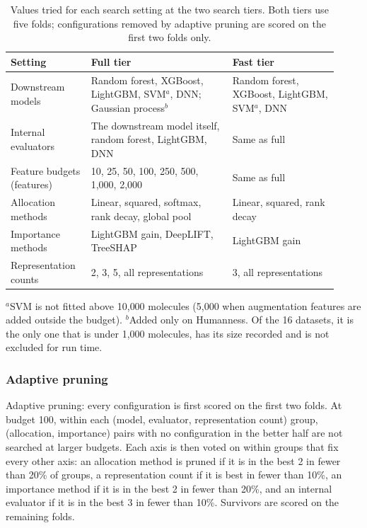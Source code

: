 \begin{table}[htbp]
\centering
\caption[Values tried for each search setting.]{Values tried for each search setting at the two search tiers. Both tiers use five folds; configurations removed by adaptive pruning are scored on the first two folds only.}
\label{tab:search_tiers}
\begin{adjustbox}{max width=\textwidth}
\begin{tabular}{@{}P{0.22\linewidth}P{0.40\linewidth}P{0.30\linewidth}@{}}
\toprule
Setting & Full tier & Fast tier \\
\midrule
Downstream models & Random forest, XGBoost, LightGBM, SVM$^{a}$, DNN; Gaussian process$^{b}$ & Random forest, XGBoost, LightGBM, SVM$^{a}$, DNN \\
Internal evaluators & The downstream model itself, random forest, LightGBM, DNN & Same as full \\
Feature budgets (features) & 10, 25, 50, 100, 250, 500, 1{,}000, 2{,}000 & Same as full \\
Allocation methods & Linear, squared, softmax, rank decay, global pool & Linear, squared, rank decay \\
Importance methods & LightGBM gain, DeepLIFT, TreeSHAP & LightGBM gain \\
Representation counts & 2, 3, 5, all representations & 3, all representations \\
\bottomrule
\end{tabular}
\end{adjustbox}

\smallskip
{\footnotesize $^{a}$SVM is not fitted above 10{,}000 molecules (5{,}000 when augmentation features are added outside the budget). $^{b}$Added only on Humanness. Of the 16 datasets, it is the only one that is under 1{,}000 molecules, has its size recorded and is not excluded for run time.}
\end{table}

\subsubsection{Adaptive pruning}

Adaptive pruning: every configuration is first scored on the first two folds. At budget 100, within each (model, evaluator, representation count) group, (allocation, importance) pairs with no configuration in the better half are not searched at larger budgets. Each axis is then voted on within groups that fix every other axis: an allocation method is pruned if it is in the best 2 in fewer than 20\% of groups, a representation count if it is best in fewer than 10\%, an importance method if it is in the best 2 in fewer than 20\%, and an internal evaluator if it is in the best 3 in fewer than 10\%. Survivors are scored on the remaining folds.

